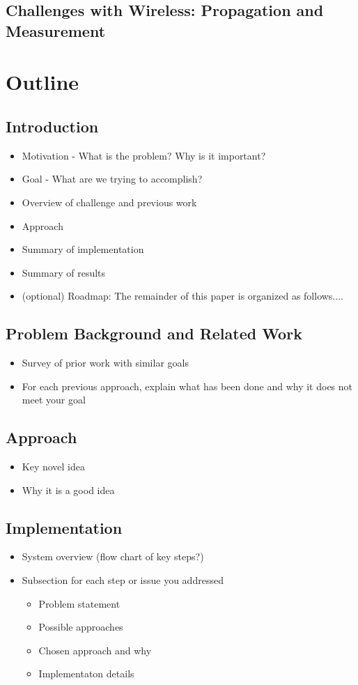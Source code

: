 \documentclass[pageno]{jpaper}
\begin{document}
\subsection{Challenges with Wireless: Propagation and Measurement}
 
\section{Outline}  

\subsection{Introduction}
\begin{itemize}
	\item Motivation - What is the problem? Why is it important?
	\item Goal - What are we trying to accomplish?
	\item Overview of challenge and previous work 
	\item Approach 
	\item Summary of implementation
	\item Summary of results
	\item (optional) Roadmap: The remainder of this paper is organized as follows....
\end{itemize}

\subsection{Problem Background and Related Work}
\begin{itemize}
	\item Survey of prior work with similar goals 
	\item For each previous approach, explain what has been done and why it does not meet your goal
\end{itemize}

\subsection{Approach}
\begin{itemize}
	\item Key novel idea
	\item Why it is a good idea
\end{itemize}

\subsection{Implementation}
\begin{itemize}
	\item System overview (flow chart of key steps?)
	\item Subsection for each step or issue you addressed
	\begin{itemize}
		\item Problem statement
		\item Possible approaches
		\item Chosen approach and why
		\item Implementaton details
	\end{itemize}
\end{itemize}
\end{document}
